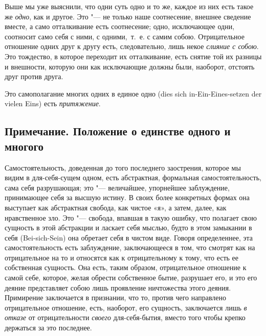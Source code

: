Выше мы уже выяснили, что одни суть одно и то же, каждое из них есть такое
же {\em одно}, как и другое. Это "--- не только наше
соотнесение, внешнее сведение вместе, а само отталкивание есть соотнесение;
одно, исключающее одни, соотносит само себя с ними, с одними,~т.~е. с самим
собою. Отрицательное отношение одних друг к другу есть, следовательно, лишь
некое {\em слияние с собою}. Это тождество, в которое
переходит их отталкивание, есть снятие той их разницы и внешности, которую
они как исключающие должны были, наоборот, отстоять друг против друга.

Это самополагание многих одних в единое одно
(dies sich in-Ein-Eines-setzen der vielen Eins)
есть {\em притяжение}.

\subsection*{Примечание. Положение о единстве одного и многого}

Самостоятельность, доведенная до того последнего заострения, которое мы
видим в для-себя-сущем одном, есть абстрактная, формальная
самостоятельность, сама себя разрушающая; это "--- величайшее, упорнейшее
заблуждение, принимающее себя за высшую истину. В своих более конкретных
формах она выступает как абстрактная свобода, как чистое «я», а затем,
далее, как нравственное зло. Это "--- свобода, впавшая в такую ошибку, что
полагает свою сущность в этой абстракции и ласкает себя мыслью, будто в
этом замыкании в себя (Bei-sich-Sein) она обретает себя в чистом виде.
Говоря определеннее, эта самостоятельность есть заблуждение, заключающееся
в том, что смотрят как на отрицательное на то и относятся как к
отрицательному к тому, что есть ее собственная сущность. Она есть, таким
образом, отрицательное отношение к самой себе, которое, желая обрести
собственное бытие, разрушает его, и это его деяние представляет собою лишь
проявление ничтожества этого деяния. Примирение заключается в признании,
что то, против чего направлено отрицательное отношение, есть, наоборот, его
сущность, заключается лишь {\em в отказе} от
отрицательности {\em своего} для-себя-бытия, вместо
того чтобы крепко держаться за это последнее.

